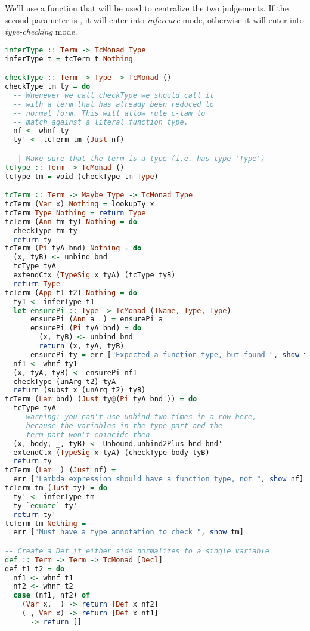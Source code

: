 \documentclass[
       embeddedlogo,
       english,
       lmodern,
       coorientadorbanca,
       noabntexcite
]{ufsc-thesis-rn46-2019}
\theoremstyle{definition}
\newcommand{\code}[1]{\text{\scpfamily\setlength\spaceskip{0.35em}#1}}
\begin{document}
We'll use a \code{tcTerm} function that will be used to centralize the two judgements. If the second parameter is \code{Nothing}, it will enter into \emph{inference} mode, otherwise it will enter into \emph{type-checking} mode.

\begin{lstlisting}[language=Haskell]
inferType :: Term -> TcMonad Type
inferType t = tcTerm t Nothing

checkType :: Term -> Type -> TcMonad ()
checkType tm ty = do
  -- Whenever we call checkType we should call it
  -- with a term that has already been reduced to 
  -- normal form. This will allow rule c-lam to
  -- match against a literal function type.
  nf <- whnf ty
  ty' <- tcTerm tm (Just nf)

-- | Make sure that the term is a type (i.e. has type 'Type')
tcType :: Term -> TcMonad ()
tcType tm = void (checkType tm Type)

tcTerm :: Term -> Maybe Type -> TcMonad Type
tcTerm (Var x) Nothing = lookupTy x
tcTerm Type Nothing = return Type
tcTerm (Ann tm ty) Nothing = do
  checkType tm ty
  return ty
tcTerm (Pi tyA bnd) Nothing = do
  (x, tyB) <- unbind bnd
  tcType tyA
  extendCtx (TypeSig x tyA) (tcType tyB)
  return Type
tcTerm (App t1 t2) Nothing = do
  ty1 <- inferType t1
  let ensurePi :: Type -> TcMonad (TName, Type, Type)
      ensurePi (Ann a _) = ensurePi a
      ensurePi (Pi tyA bnd) = do
        (x, tyB) <- unbind bnd
        return (x, tyA, tyB)
      ensurePi ty = err ["Expected a function type, but found ", show ty]
  nf1 <- whnf ty1
  (x, tyA, tyB) <- ensurePi nf1
  checkType (unArg t2) tyA
  return (subst x (unArg t2) tyB)
tcTerm (Lam bnd) (Just ty@(Pi tyA bnd')) = do
  tcType tyA
  -- warning: you can't use unbind two times in a row here,
  -- because the variables in the type part and the
  -- term part won't coincide then
  (x, body, _, tyB) <- Unbound.unbind2Plus bnd bnd'
  extendCtx (TypeSig x tyA) (checkType body tyB)
  return ty
tcTerm (Lam _) (Just nf) =
  err ["Lambda expression should have a function type, not ", show nf]
tcTerm tm (Just ty) = do
  ty' <- inferType tm
  ty `equate` ty'
  return ty'
tcTerm tm Nothing =
  err ["Must have a type annotation to check ", show tm]

-- Create a Def if either side normalizes to a single variable
def :: Term -> Term -> TcMonad [Decl]
def t1 t2 = do
  nf1 <- whnf t1
  nf2 <- whnf t2
  case (nf1, nf2) of
    (Var x, _) -> return [Def x nf2]
    (_, Var x) -> return [Def x nf1]
    _ -> return []
\end{lstlisting}
\end{document}
